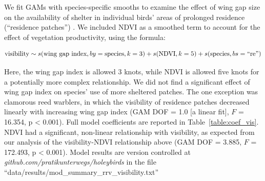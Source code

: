 We fit GAMs with species-specific smooths to examine the effect of wing gap size on the availability of shelter in individual birds' areas of prolonged residence (``residence patches'') \cite{gupte2022d}.
We included NDVI as a smoothed term to account for the effect of vegetation productivity, using the formula:
\begin{linenomath*}
$$ \text{visibility} \sim s(\text{wing gap index}, by = \text{species}, k = 3) + \\
    s(\text{NDVI}, k = 5) + s(\text{species}, bs = \text{``re''})
$$
\end{linenomath*}
Here, the wing gap index is allowed 3 knots, while NDVI is allowed five knots for a potentially more complex relationship.
We did not find a significant effect of wing gap index on species' use of more sheltered patches.
The one exception was clamorous reed warblers, in which the visibility of residence patches decreased linearly with increasing wing gap index (GAM DOF = 1.0 [a linear fit], $F$ = 16.354, p < 0.001).
Full model coefficients are reported in Table~\ref{table:coef_vis}.
NDVI had a significant, non-linear relationship with visibility, as expected from our analysis of the visibility-NDVI relationship above (GAM DOF = 3.885, $F$ = 172.493, p < 0.001).
Model results are version controlled at \textit{github.com/pratikunterwegs/holeybirds} in the file ``data/results/mod\_summary\_rrv\_visibility.txt''

